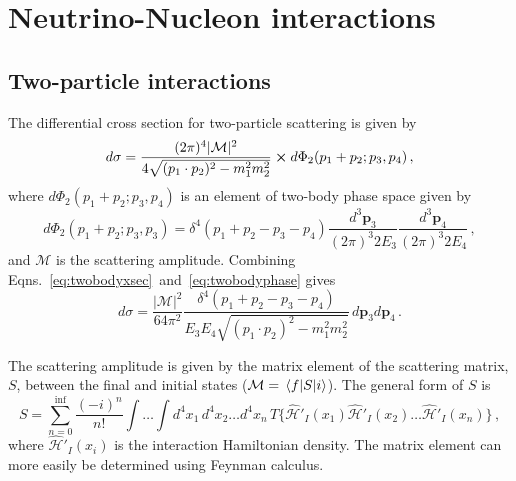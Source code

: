 \section{Neutrino-Nucleon interactions} \label{sec:theory}
\hspace{\parindent}

\subsection{Two-particle interactions}
  The differential cross section for two-particle scattering is given by
  \begin{equation}\label{eq:twobodyxsec}
    d\sigma = \frac{(2\pi)^4 |\mathcal{M}|^2}{4 \sqrt{(p_1\cdot p_2)^2 - m_1^2m_2^2}}
      \cross d\Phi_2(p_1+p_2;p_3,p_4) \,,
  \end{equation}
  where $d\Phi_2(p_1+p_2;p_3,p_4)$ is an element of two-body phase space given by
  \begin{equation}\label{eq:twobodyphase}
      d\Phi_2(p_1+p_2;p_3,p_3) = \delta^4(p_1+p_2 - p_3-p_4)
        \frac{d^3\mathbf{p}_3}{(2\pi)^3 2E_3}\frac{d^3\mathbf{p}_4}{(2\pi)^3 2E_4} \,,
  \end{equation}
  and $\mathcal{M}$ is the scattering amplitude.
  Combining Eqns.~\ref{eq:twobodyxsec}~and~\ref{eq:twobodyphase} gives
  \begin{equation}
      d\sigma = \frac{|\mathcal{M}|^2}{64\pi^2}
        \frac{\delta^4(p_1+p_2-p_3-p_4)}{E_3E_4\sqrt{(p_1\cdot p_2)^2 - m_1^2m_2^2}}
        \, d\mathbf{p}_3d\mathbf{p}_4 \,.
  \end{equation}

  The scattering amplitude is given by the matrix element of the scattering
  matrix, $S$, between the final and initial states ($\mathcal{M} =
  \mel{f}{S}{i}$).  The general form of $S$ is
  \begin{equation}
    S = \sum_{n=0}^{\inf} \frac{(-i)^n}{n!}\int\dots\int d^4x_1 \, d^4x_2 \dots d^4x_n\,
      T\{\hat{\mathcal{H}}'_I(x_1)\hat{\mathcal{H}}'_I(x_2)\dots\hat{\mathcal{H}}'_I(x_n)\} \,,
  \end{equation}
  where $\hat{\mathcal{H}}'_I(x_i)$ is the interaction Hamiltonian density. The
  matrix element can more easily be determined using Feynman calculus.

